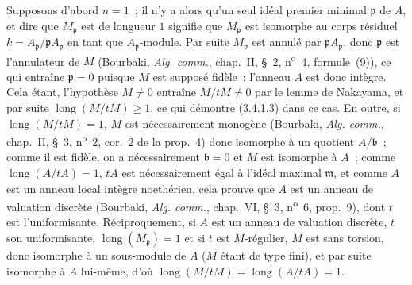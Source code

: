 \documentclass[10pt,oneside]{book}
\begin{document}
Supposons d'abord $n=1$~; il n'y a alors qu'un seul idéal premier minimal
$\mathfrak p$ de $A$, et dire que $M_{\mathfrak p}$ est de longueur $1$
signifie que $M_{\mathfrak p}$ est isomorphe au corps résiduel
$k=A_{\mathfrak p}/\mathfrak pA_{\mathfrak p}$ en tant que
$A_{\mathfrak p}$-module. Par suite $M_{\mathfrak p}$ est annulé par
$\mathfrak pA_{\mathfrak p}$, donc $\mathfrak p$ est l'annulateur de $M$
(Bourbaki, \emph{Alg. comm.}, chap.~II, \S~2, n\textsuperscript{o}~4,
formule~(9)), ce qui entraîne $\mathfrak p=0$ puisque $M$ est supposé fidèle~;
l'anneau $A$ est donc intègre. Cela étant, l'hypothèse $M\neq0$ entraîne
$M/tM\neq0$ par le lemme de Nakayama, et par suite
$\operatorname{long}(M/tM)\geqslant1$, ce qui démontre (3.4.1.3) dans ce cas.
En outre, si $\operatorname{long}(M/tM)=1$, $M$ est nécessairement monogène
(Bourbaki, \emph{Alg. comm.}, chap.~II, \S~3, n\textsuperscript{o}~2, cor.~2
de la prop.~4) donc isomorphe à un quotient $A/\mathfrak b$~; comme il est
fidèle, on a nécessairement $\mathfrak b=0$ et $M$ est isomorphe à $A$~;
comme $\operatorname{long}(A/tA)=1$, $tA$ est nécessairement égal à l'idéal
maximal $\mathfrak m$, et comme $A$ est un anneau local intègre noethérien,
cela prouve que $A$ est un anneau de valuation discrète (Bourbaki,
\emph{Alg. comm.}, chap.~VI, \S~3, n\textsuperscript{o}~6, prop.~9), dont $t$
est l'uniformisante. Réciproquement, si $A$ est un anneau de valuation
discrète, $t$ son uniformisante, $\operatorname{long}(M_{\mathfrak p})=1$ et
si $t$ est $M$-régulier, $M$ est sans torsion, donc isomorphe à un sous-module
de $A$ ($M$ étant de type fini), et par suite isomorphe à $A$ lui-même, d'où
$\operatorname{long}(M/tM)=\operatorname{long}(A/tA)=1$.
\end{document}
